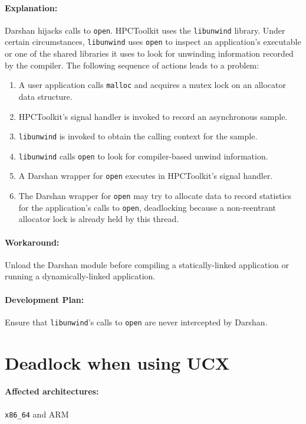 \documentclass[11pt,letterpaper]{report}
\begin{document}
\paragraph{Explanation:} Darshan hijacks calls to \verb|open|.
HPCToolkit uses the \verb|libunwind| library.
Under certain circumstances, \verb|libunwind| uses \verb|open| to inspect an application's executable or one of the shared libraries it uses to look for unwinding information recorded by the compiler.
The following sequence of actions leads to a problem:
\begin{enumerate}
\item
A user application calls \verb|malloc| and acquires a mutex lock on an allocator data structure.
\item
HPCToolkit's signal handler is invoked to record an asynchronous sample.
\item
\verb|libunwind| is invoked to obtain the calling context for the sample.
\item
\verb|libunwind|  calls \verb|open| to look for
compiler-based unwind information.
\item
A Darshan wrapper for \verb|open| executes in HPCToolkit's signal handler.
\item
The Darshan wrapper for \verb|open| may try to allocate data to record statistics for the application's calls to \verb|open|, deadlocking because a non-reentrant allocator lock is already held by this thread.
\end{enumerate}

\paragraph{Workaround:} Unload the Darshan module before compiling a statically-linked application or running a dynamically-linked application.

\paragraph{Development Plan:} Ensure that \verb|libunwind|'s calls to \verb|open| are never intercepted by Darshan.

\section{Deadlock when using UCX}

\paragraph{Affected architectures:} \verb|x86_64| and ARM
\end{document}
